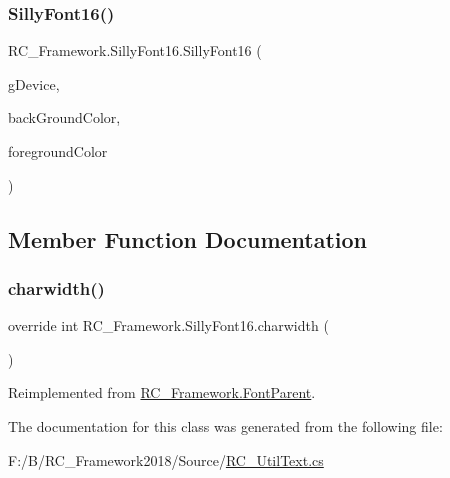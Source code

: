 \subsubsection{\texorpdfstring{Silly\+Font16()}{SillyFont16()}}
{\footnotesize\ttfamily R\+C\+\_\+\+Framework.\+Silly\+Font16.\+Silly\+Font16 (\begin{DoxyParamCaption}\item[{Graphics\+Device}]{g\+Device,  }\item[{Color}]{back\+Ground\+Color,  }\item[{Color}]{foreground\+Color }\end{DoxyParamCaption})}



\subsection{Member Function Documentation}
\mbox{\label{class_r_c___framework_1_1_silly_font16_aa718495839a1492ebf5d7245d7d4620a}} 
\subsubsection{\texorpdfstring{charwidth()}{charwidth()}}
{\footnotesize\ttfamily override int R\+C\+\_\+\+Framework.\+Silly\+Font16.\+charwidth (\begin{DoxyParamCaption}{ }\end{DoxyParamCaption})\hspace{0.3cm}{\ttfamily [virtual]}}



Reimplemented from \mbox{\hyperlink{class_r_c___framework_1_1_font_parent_af32d5427b8feea59eb6f303ac3c36516}{R\+C\+\_\+\+Framework.\+Font\+Parent}}.



The documentation for this class was generated from the following file\+:\begin{DoxyCompactItemize}
\item 
F\+:/\+B/\+R\+C\+\_\+\+Framework2018/\+Source/\mbox{\hyperlink{_r_c___util_text_8cs}{R\+C\+\_\+\+Util\+Text.\+cs}}\end{DoxyCompactItemize}
